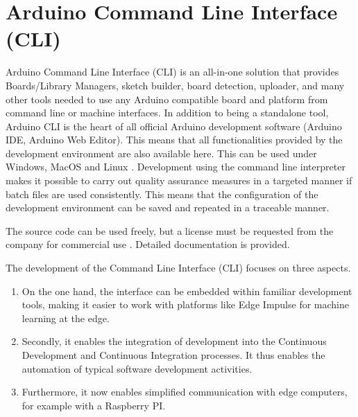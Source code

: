 %
%
%



\chapter{Arduino Command Line Interface (CLI)}

Arduino Command Line Interface (CLI) is an all-in-one solution that provides Boards/Library Managers, sketch builder, board detection, uploader, and many other tools needed to use any Arduino compatible board and platform from command line or machine interfaces.
In addition to being a standalone tool, Arduino CLI is the heart of all official Arduino development software (Arduino IDE, Arduino Web Editor). This means that all functionalities provided by the development environment are also available here. This can be used under Windows, MacOS and Linux \cite{ArduinoCLIpro:2024}. Development using the command line interpreter makes it possible to carry out quality assurance measures in a targeted manner if batch files are used consistently. This means that the configuration of the development environment can be saved and repeated in a traceable manner.


The source code can be used freely, but a license must be requested from the company for commercial use \cite{ArduinoCLIGit:2024}. Detailed documentation is provided. \cite{ArduinoCLIDoc:2024}

The development of the Command Line Interface (CLI) focuses on three aspects.
\begin{enumerate}
	\item On the one hand, the interface can be embedded within familiar development tools, making it easier to work with platforms like Edge Impulse for machine learning at the edge.
	\item Secondly, it enables the integration of development into the Continuous Development and Continuous Integration processes. It thus enables the automation of typical software development activities.
	\item Furthermore, it now enables simplified communication with edge computers, for example with a Raspberry PI.
\end{enumerate}

